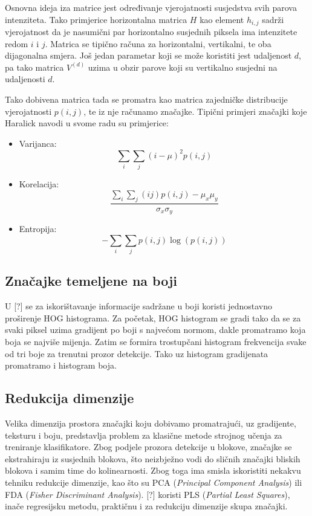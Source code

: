 \documentclass[seminar]{fer}
\begin{document}
Osnovna ideja iza matrice jest određivanje vjerojatnosti susjedstva svih parova intenziteta. Tako primjerice horizontalna matrica $H$ kao element
$h_{i,j}$ sadrži vjerojatnost da je nasumični par horizontalno susjednih piksela ima intenzitete redom $i$ i $j$. Matrica se tipično računa za horizontalni, vertikalni, te oba dijagonalna smjera. Još jedan parametar koji se može koristiti jest udaljenost $d$, pa tako matrica $V^{(d)}$ uzima u obzir 
parove koji su vertikalno susjedni na udaljenosti $d$.


Tako dobivena matrica tada se promatra kao matrica zajedničke distribucije vjerojatnosti $p(i, j)$, te iz nje računamo značajke. Tipični
primjeri značajki koje Haralick navodi u svome radu su primjerice:

\begin{itemize}
  \item
  Varijanca: $$\sum_{i}\sum_{j}(i - \mu)^2p(i, j)$$
  \item
  Korelacija: $$\frac{\sum_{i}\sum_{j}(ij)p(i,j) - \mu_{x}\mu_{y}}{\sigma_{x}\sigma_{y}}$$
  \item
  Entropija: $$-\sum_{i}\sum_{j}p(i, j)\log(p(i, j))$$
\end{itemize}

\subsection{Značajke temeljene na boji}


U [?] se za iskorištavanje informacije sadržane u boji koristi jednostavno proširenje HOG histograma. Za početak, HOG histogram se gradi tako da se za
svaki piksel uzima gradijent po boji s najvećom normom, dakle promatramo koja boja se najviše mijenja. Zatim se formira trostupčani histogram frekvencija svake od tri boje za trenutni prozor detekcije. Tako uz histogram gradijenata promatramo i histogram boja.


\subsection{Redukcija dimenzije}


Velika dimenzija prostora značajki koju dobivamo promatrajući, uz gradijente, teksturu i boju, predstavlja problem za klasične metode strojnog učenja
za treniranje klasifikatore. Zbog podjele prozora detekcije u blokove, značajke se ekstrahiraju iz susjednih blokova, što neizbježno vodi do
sličnih značajki bliskih blokova i samim time do kolinearnosti. Zbog toga ima smisla iskoristiti nekakvu tehniku redukcije dimenzije, kao što su
PCA (\emph{Principal Component Analysis}) ili FDA (\emph{Fisher Discriminant Analysis}). [?] koristi PLS (\emph{Partial Least Squares}), inače 
regresijsku metodu, praktičnu i za redukciju dimenzije skupa značajki. 
\end{document}
